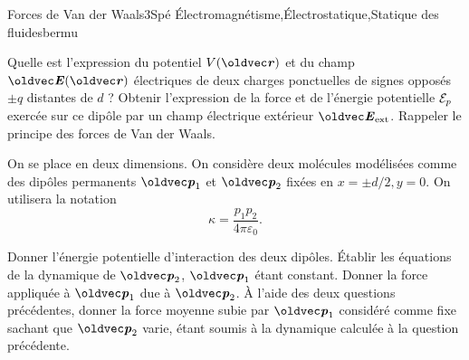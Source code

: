 
\begin{exercise}{Forces de Van der Waals}{3}{Spé}
{\'Electromagnétisme,\'Electrostatique,Statique des fluides}{bermu}

\begin{questions}
    \questioncours Quelle est l'expression du potentiel $V(\vr)$ et du champ $\vE(\vr)$ électriques de deux charges ponctuelles de signes opposés $\pm q$ distantes de $d$ ?
    \question Obtenir l'expression de la force et de l'énergie potentielle $\mathcal{E}_p$ exercée sur ce dipôle par un champ électrique extérieur $\vE_\text{ext}$.
    \question Rappeler le principe des forces de Van der Waals.
   
\begin{EnvUplevel}

On se place en deux dimensions. On considère deux molécules modélisées comme des dipôles permanents $\vp_1$ et $\vp_2$ fixées en $x = \pm d/2, y = 0$. On utilisera la notation
$$\kappa = \dfrac{p_1 p_2}{4\pi\varepsilon_0}.$$
\end{EnvUplevel}
    \question Donner l'énergie potentielle d'interaction des deux dipôles.
    \question \'Etablir les équations de la dynamique de $\vp_2$, $\vp_1$ étant constant.
    \question Donner la force appliquée à $\vp_1$ due à $\vp_2$.
    \question \`A l'aide des deux questions précédentes, donner la force moyenne subie par $\vp_1$ considéré comme fixe sachant que $\vp_2$ varie, étant soumis à la dynamique calculée à la question précédente.
\end{questions}


\end{exercise}
